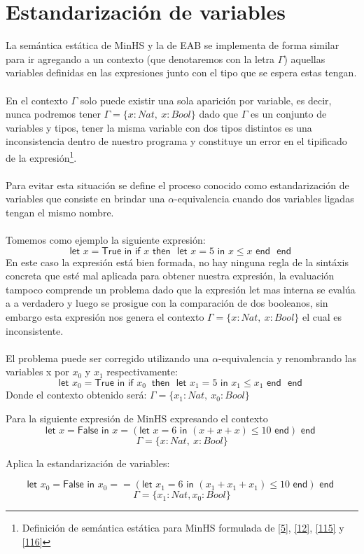 \section{Estandarización de variables}
La semántica estática de \textsf{MinHS} y la de \textsf{EAB} se implementa de forma similar para ir agregando a un contexto (que denotaremos con la letra $\Gamma$) aquellas variables definidas en las expresiones junto con el tipo que se espera estas tengan.\\\\
En el contexto $\Gamma$ solo puede existir una sola aparición por variable, es decir, nunca podremos tener $\Gamma=\{x : Nat,\ x : Bool\}$ dado que $\Gamma$ es un conjunto de variables y tipos, tener la misma variable con dos tipos distintos es una inconsistencia dentro de nuestro programa y constituye un error en el tipificado de la expresión\footnote{Definición de semántica estática para \textsf{MinHS} formulada de  \hyperlink{5}{[5]},  \hyperlink{12}{[12]}, \hyperlink{115}{[115]} y \hyperlink{116}{[116]}}.\\\\
Para evitar esta situación se define el proceso conocido como estandarización de variables que consiste en brindar una $\alpha$-equivalencia cuando dos variables ligadas tengan el mismo nombre.\\\\
Tomemos como ejemplo la siguiente expresión:
$$ \textsf{let } x = \textsf{True} \textsf{ in } \textsf{if } x \textsf{ then } \textsf{ let } x = 5 \textsf{ in } x \leq x \textsf{ end } \textsf{ end }$$
En este caso la expresión está bien formada, no hay ninguna regla de la sintáxis concreta que esté mal aplicada para obtener nuestra expresión, la evaluación tampoco comprende un problema dado que la expresión \textsf{let} mas interna se evalúa a a verdadero y luego se prosigue con la comparación de dos booleanos, sin embargo esta expresión nos genera el contexto $\Gamma=\{x : Nat,\ x : Bool\}$ el cual es inconsistente.\\\\
El problema puede ser corregido utilizando una $\alpha$-equivalencia y renombrando las variables x por $x_0$ y $x_1$ respectivamente:
$$ \textsf{let } x_0 = \textsf{True} \textsf{ in } \textsf{if } x_0\ \textsf{ then } \textsf{ let } x_1 = 5 \textsf{ in } x_1 \leq x_1 \textsf{ end } \textsf{ end }$$
Donde el contexto obtenido será: $\Gamma=\{x_1 : Nat,\ x_0 : Bool\}$

\begin{exercise}
    Para la siguiente expresión de \textsf{MinHS} expresando el contexto
    $$\textsf{let } x = \textsf{False} \textsf{ in } x = (\textsf{let } x = 6 \textsf{ in } (x + x + x) \leq 10 \textsf{ end}) \textsf{ end }$$
    $$\Gamma=\{x : Nat,\ x : Bool\}$$
    
    Aplica la estandarización de variables:
    
    $$\textsf{let } x_0 = \textsf{False} \textsf{ in } x_0 == (\textsf{let } x_1 = 6 \textsf{ in } (x_1 + x_1 + x_1) \leq 10 \textsf{ end}) \textsf{ end }$$
    $$\Gamma=\{x_1 : Nat, x_0 : Bool\}$$

\end{exercise} 

